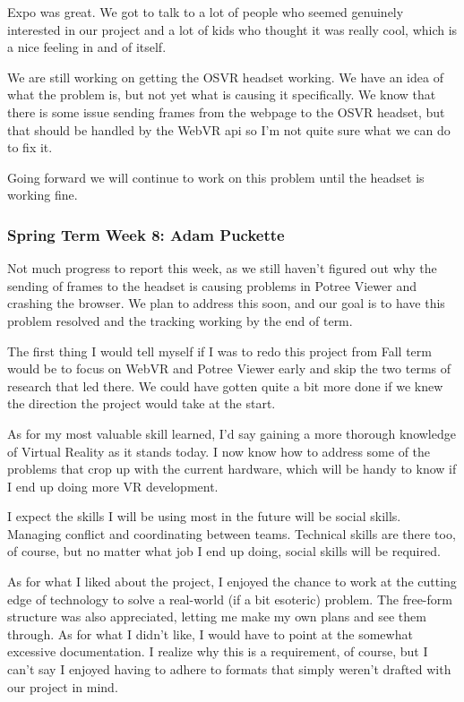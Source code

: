 \documentclass[draftclsnofoot,onecolumn]{IEEEtran}
\begin{document}
Expo was great. We got to talk to a lot of people who seemed genuinely interested in our project and a lot of kids who thought it was really cool, which is a nice feeling in and of itself.

We are still working on getting the OSVR headset working. We have an idea of what the problem is, but not yet what is causing it specifically. We know that there is some issue sending frames from the webpage to the OSVR headset, but that should be handled by the WebVR api so I'm not quite sure what we can do to fix it.

Going forward we will continue to work on this problem until the headset is working fine.

\subsubsection{Spring Term Week 8: Adam Puckette}

Not much progress to report this week, as we still haven't figured out why the sending of frames to the headset is causing problems in Potree Viewer and crashing the browser. We plan to address this soon, and our goal is to have this problem resolved and the tracking working by the end of term.

The first thing I would tell myself if I was to redo this project from Fall term would be to focus on WebVR and Potree Viewer early and skip the two terms of research that led there. We could have gotten quite a bit more done if we knew the direction the project would take at the start.

As for my most valuable skill learned, I'd say gaining a more thorough knowledge of Virtual Reality as it stands today. I now know how to address some of the problems that crop up with the current hardware, which will be handy to know if I end up doing more VR development.

I expect the skills I will be using most in the future will be social skills. Managing conflict and coordinating between teams. Technical skills are there too, of course, but no matter what job I end up doing, social skills will be required.

As for what I liked about the project, I enjoyed the chance to work at the cutting edge of technology to solve a real-world (if a bit esoteric) problem. The free-form structure was also appreciated, letting me make my own plans and see them through. As for what I didn't like, I would have to point at the somewhat excessive documentation. I realize why this is a requirement, of course, but I can't say I enjoyed having to adhere to formats that simply weren't drafted with our project in mind.
\end{document}
